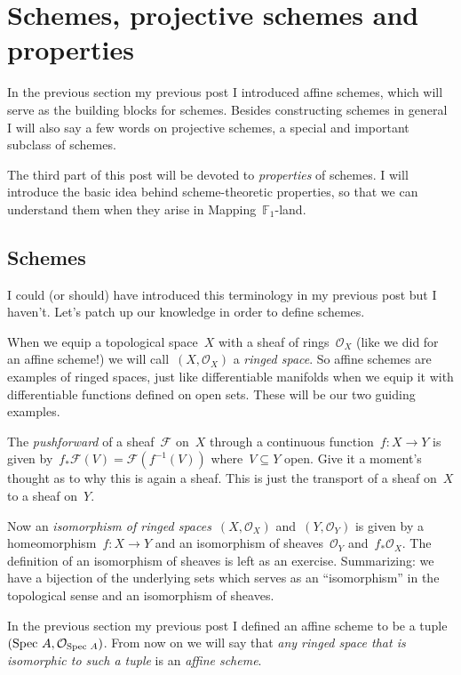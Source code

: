 \section{Schemes, projective schemes and properties}

In \iftex the previous section \fi\ifblog my previous post \fi I introduced affine schemes, which will serve as the building blocks for schemes. Besides constructing schemes in general I will also say a few words on projective schemes, a special and important subclass of schemes.

The third part of this post will be devoted to \emph{properties} of schemes. I will introduce the basic idea behind scheme-theoretic properties, so that we can understand them when they arise in \iftex\cite{mapping-fun}\fi\ifblog Mapping~$\mathbb{F}_1$-land\fi.

\subsection{Schemes}
I could (or should) have introduced this terminology in my previous post but I haven't. Let's patch up our knowledge in order to define schemes.

\begin{definition}
  When we equip a topological space~$X$ with a sheaf of rings~$\mathcal{O}_X$ (like we did for an affine scheme!) we will call~$(X,\mathcal{O}_X)$ a \emph{ringed space}. So affine schemes are examples of ringed spaces, just like differentiable manifolds when we equip it with differentiable functions defined on open sets. These will be our two guiding examples.
\end{definition}

\begin{definition}
  The \emph{pushforward} of a sheaf~$\mathcal{F}$ on~$X$ through a continuous function~$f\colon X\to Y$ is given by~$f_\ast\mathcal{F}(V)=\mathcal{F}(f^{-1}(V))$ where~$V\subseteq Y$ open. Give it a moment's thought as to why this is again a sheaf. This is just the transport of a sheaf on~$X$ to a sheaf on~$Y$.
\end{definition}

\begin{definition}
  Now an \emph{isomorphism of ringed spaces}~$(X,\mathcal{O}_X)$ and~$(Y,\mathcal{O}_Y)$ is given by a homeomorphism~$f\colon X\to Y$ and an isomorphism of sheaves~$\mathcal{O}_Y$ and~$f_\ast\mathcal{O}_X$. The definition of an isomorphism of sheaves is left as an exercise. Summarizing: we have a bijection of the underlying sets which serves as an ``isomorphism'' in the topological sense and an isomorphism of sheaves.
  
  In \iftex the previous section \fi\ifblog my previous post \fi I defined an affine scheme to be a tuple~$(\operatorname{Spec\,} A,\mathcal{O}_{\operatorname{Spec\,} A})$. From now on we will say that \emph{any ringed space that is isomorphic to such a tuple} is an \emph{affine scheme}.
\end{definition}


